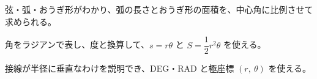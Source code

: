 \begin{furikaeri}
\begin{checklist}
\item 弦・弧・おうぎ形がわかり、弧の長さとおうぎ形の面積を、中心角に比例させて求められる。
\item 角をラジアンで表し、度と換算して、$s=r\theta$ と $S=\dfrac{1}{2}r^2\theta$ を使える。
\item 接線が半径に垂直なわけを説明でき、DEG・RAD と極座標 $(r,\ \theta)$ を使える。
\end{checklist}
\end{furikaeri}

